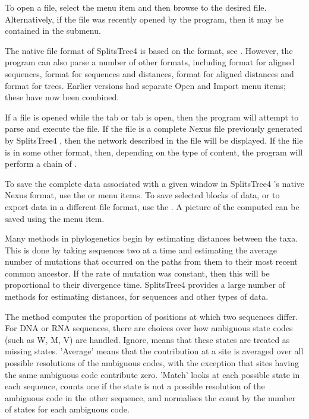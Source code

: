 \documentclass[11pt]{article}
\def\SplitsTree{{\sf SplitsTree4 }}
\begin{document}

To open a file, select the 
menu item and then browse to the desired file. Alternatively, if the file
was recently opened by the program, then it may be contained in
the  submenu.

The native file format of \SplitsTree is based on the  format,
see \cite{NEXUS}.
However, the program can also parse a number of other formats, including
 format for aligned sequences,
 format for sequences and distances,  format for aligned
distances and  format for trees. Earlier versions had separate Open and Import menu items; these have now been combined.

If a file is opened while the  tab or
 tab is open,
then the program will attempt to parse and execute the file.
If the file is a complete Nexus file previously generated by \SplitsTree, then
the network described in the file will be displayed.
If the file is in some other format, then, depending on the type of content,
the program will perform a chain of .

To save the complete data associated with a given window in \SplitsTree's
native Nexus format, use the 
or  menu items.
To save selected blocks of data, or to export data in a different
file format, use the .
A picture of the computed  can be saved using
the  menu item.


Many methods in phylogenetics begin by estimating distances between the
taxa. This is done by
taking sequences two at a time and estimating the average number of mutations
that occurred on the paths from them to their most recent common ancestor. If
the rate of mutation was constant, then this will be proportional to their
divergence time. \SplitsTree provides a large number of methods for estimating
distances, for sequences and other types of data.

The  method computes the proportion of positions at
which two
sequences differ. For DNA or RNA sequences, there are choices over how ambiguous
state codes (such as W, M, V) are handled. Ignore, means that these states are
treated as missing states.  'Average' means that the contribution at a site is
averaged over all possible resolutions of the ambiguous codes, with the
exception that sites having the same ambiguous code contribute zero. 'Match'
looks at each possible state in each sequence, counts one if the state is not a
possible resolution of the ambiguous code in the other sequence, and normalises
the count by the number of states for each ambiguous code.
\end{document}
